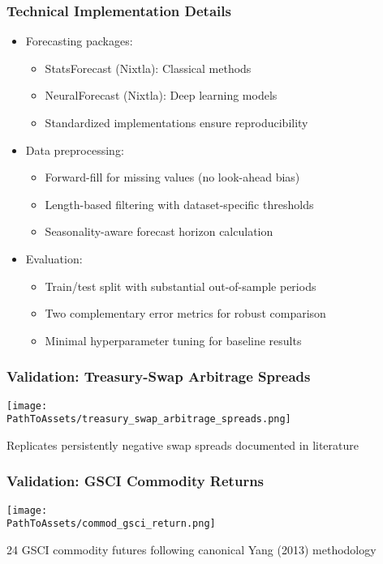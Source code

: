 \documentclass[ignorenonframetext, 9pt]{beamer}
\begin{document}
\begin{frame}
  \frametitle{Technical Implementation Details}
  \label{slide:technical}
\begin{itemize}
\item \alert{Forecasting packages:}
\begin{itemize}
  \item StatsForecast (Nixtla): Classical methods
  \item NeuralForecast (Nixtla): Deep learning models
  \item Standardized implementations ensure reproducibility
\end{itemize}
\vspace{0.3cm}
\item \alert{Data preprocessing:}
\begin{itemize}
  \item Forward-fill for missing values (no look-ahead bias)
  \item Length-based filtering with dataset-specific thresholds
  \item Seasonality-aware forecast horizon calculation
\end{itemize}
\vspace{0.3cm}
\item \alert{Evaluation:}
\begin{itemize}
  \item Train/test split with substantial out-of-sample periods
  \item Two complementary error metrics for robust comparison
  \item Minimal hyperparameter tuning for baseline results
\end{itemize}
\end{itemize}
\end{frame}

\begin{frame}
  \frametitle{Validation: Treasury-Swap Arbitrage Spreads}
  \centering
  \texttt{[image: \\PathToAssets/treasury\_swap\_arbitrage\_spreads.png]}
  \vspace{0.2cm}

  \scriptsize
  Replicates persistently negative swap spreads documented in literature
\end{frame}

\begin{frame}
  \frametitle{Validation: GSCI Commodity Returns}
  \centering
  \texttt{[image: \\PathToAssets/commod\_gsci\_return.png]}
  \vspace{0.2cm}

  \scriptsize
  24 GSCI commodity futures following canonical Yang (2013) methodology
\end{frame}
\end{document}
